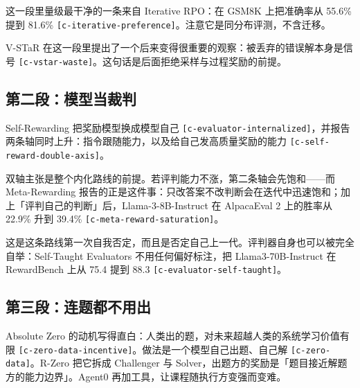 这一段里量级最干净的一条来自 Iterative RPO：在 GSM8K 上把准确率从 55.6\% 提到 81.6\% {\scriptsize\texttt{[c-\hspace{0pt}iterative-\hspace{0pt}preference]}}。注意它是同分布评测，不含迁移。


V-STaR 在这一段里提出了一个后来变得很重要的观察：被丢弃的错误解本身是信号 {\scriptsize\texttt{[c-\hspace{0pt}vstar-\hspace{0pt}waste]}}。这句话是后面拒绝采样与过程奖励的前提。


\subsection{第二段：模型当裁判}

Self-Rewarding 把奖励模型换成模型自己 {\scriptsize\texttt{[c-\hspace{0pt}evaluator-\hspace{0pt}internalized]}}，并报告两条轴同时上升：指令跟随能力，以及给自己发高质量奖励的能力 {\scriptsize\texttt{[c-\hspace{0pt}self-\hspace{0pt}reward-\hspace{0pt}double-\hspace{0pt}axis]}}。


双轴主张是整个内化路线的前提。若评判能力不涨，第二条轴会先饱和——而 Meta-Rewarding 报告的正是这件事：只改答案不改判断会在迭代中迅速饱和；加上「评判自己的判断」后，Llama-3-8B-Instruct 在 AlpacaEval 2 上的胜率从 22.9\% 升到 39.4\% {\scriptsize\texttt{[c-\hspace{0pt}meta-\hspace{0pt}reward-\hspace{0pt}saturation]}}。


这是这条路线第一次自我否定，而且是否定自己上一代。评判器自身也可以被完全自举：Self-Taught Evaluators 不用任何偏好标注，把 Llama3-70B-Instruct 在 RewardBench 上从 75.4 提到 88.3 {\scriptsize\texttt{[c-\hspace{0pt}evaluator-\hspace{0pt}self-\hspace{0pt}taught]}}。


\subsection{第三段：连题都不用出}

Absolute Zero 的动机写得直白：人类出的题，对未来超越人类的系统学习价值有限 {\scriptsize\texttt{[c-\hspace{0pt}zero-\hspace{0pt}data-\hspace{0pt}incentive]}}。做法是一个模型自己出题、自己解 {\scriptsize\texttt{[c-\hspace{0pt}zero-\hspace{0pt}data]}}。R-Zero 把它拆成 Challenger 与 Solver，出题方的奖励是「题目接近解题方的能力边界」。Agent0 再加工具，让课程随执行方变强而变难。


